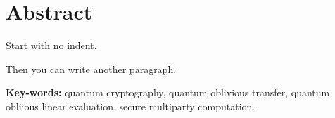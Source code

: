 
\chapter*{Abstract}
\noindent Start with no indent.

Then you can write another paragraph.

\vfill

\begin{flushleft}
\textbf{Key-words:} quantum cryptography, quantum oblivious transfer, quantum obliious linear evaluation, secure multiparty computation.
\end{flushleft}
